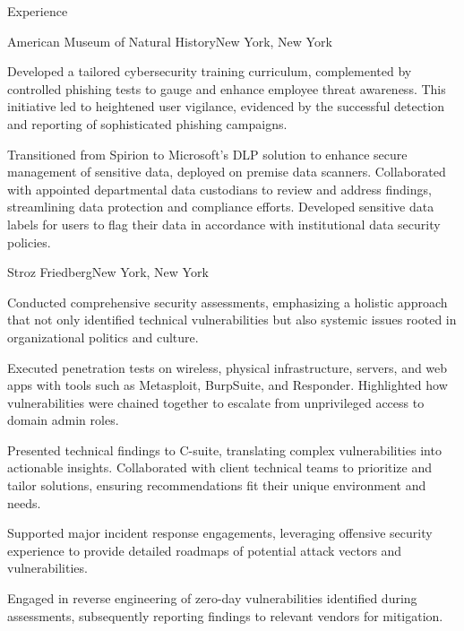 \documentclass[]{mcdowellcv}
\begin{document}
\begin{cvsection}{Experience}
\begin{jobentry}{American Museum of Natural History}{New York, New York}
\begin{jobprojects}
            \item Developed a tailored cybersecurity training curriculum, complemented by controlled phishing tests to gauge and enhance employee threat awareness. This initiative led to heightened user vigilance, evidenced by the successful detection and reporting of sophisticated phishing campaigns.
            \item Transitioned from Spirion to Microsoft's DLP solution to enhance secure management of sensitive data, deployed on premise data scanners. Collaborated with appointed departmental data custodians to review and address findings, streamlining data protection and compliance efforts. Developed sensitive data labels for users to flag their data in accordance with institutional data security policies. 
        \end{jobprojects}
    \end{jobentry}

    \begin{jobentry}{Stroz Friedberg}{New York, New York}
        \begin{jobpositions}
        \end{jobpositions}
        
        \begin{jobresponsibilities}
            \item Conducted comprehensive security assessments, emphasizing a holistic approach that not only identified technical vulnerabilities but also systemic issues rooted in organizational politics and culture.
            \item Executed penetration tests on wireless, physical infrastructure, servers, and web apps with tools such as Metasploit, BurpSuite, and Responder. Highlighted how vulnerabilities were chained together to escalate from unprivileged access to domain admin roles.
            \item Presented technical findings to C-suite, translating complex vulnerabilities into actionable insights. Collaborated with client technical teams to prioritize and tailor solutions, ensuring recommendations fit their unique environment and needs.
            \item Supported major incident response engagements, leveraging offensive security experience to provide detailed roadmaps of potential attack vectors and vulnerabilities.
            \item Engaged in reverse engineering of zero-day vulnerabilities identified during assessments, subsequently reporting findings to relevant vendors for mitigation.
        \end{jobresponsibilities}
        

\end{jobentry}
\end{cvsection}
\end{document}
